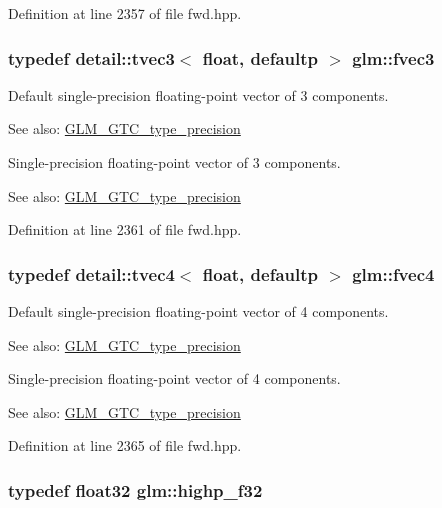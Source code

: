 Definition at line 2357 of file fwd.hpp.\hypertarget{group__gtc__type__precision_g33b85a14a8f68ec99029ff13db6af369}{
\subsubsection[fvec3]{\setlength{\rightskip}{0pt plus 5cm}typedef detail::tvec3$<$ float, defaultp $>$ {\bf glm::fvec3}}}
\label{group__gtc__type__precision_g33b85a14a8f68ec99029ff13db6af369}


Default single-precision floating-point vector of 3 components. \begin{Desc}
\item[See also:]\hyperlink{group__gtc__type__precision}{GLM\_\-GTC\_\-type\_\-precision}\end{Desc}
Single-precision floating-point vector of 3 components. \begin{Desc}
\item[See also:]\hyperlink{group__gtc__type__precision}{GLM\_\-GTC\_\-type\_\-precision} \end{Desc}


Definition at line 2361 of file fwd.hpp.\hypertarget{group__gtc__type__precision_g55d1365630d3b3ecf7c7f4e7c29a9cb1}{
\subsubsection[fvec4]{\setlength{\rightskip}{0pt plus 5cm}typedef detail::tvec4$<$ float, defaultp $>$ {\bf glm::fvec4}}}
\label{group__gtc__type__precision_g55d1365630d3b3ecf7c7f4e7c29a9cb1}


Default single-precision floating-point vector of 4 components. \begin{Desc}
\item[See also:]\hyperlink{group__gtc__type__precision}{GLM\_\-GTC\_\-type\_\-precision}\end{Desc}
Single-precision floating-point vector of 4 components. \begin{Desc}
\item[See also:]\hyperlink{group__gtc__type__precision}{GLM\_\-GTC\_\-type\_\-precision} \end{Desc}


Definition at line 2365 of file fwd.hpp.\hypertarget{group__gtc__type__precision_g48d80b6fd3a40b71b2e414493832d1ca}{
\subsubsection[highp\_\-f32]{\setlength{\rightskip}{0pt plus 5cm}typedef float32 {\bf glm::highp\_\-f32}}}
\label{group__gtc__type__precision_g48d80b6fd3a40b71b2e414493832d1ca}


